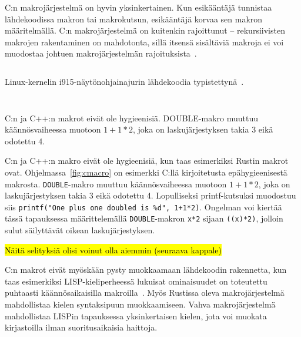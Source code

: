 C:n makrojärjestelmä on hyvin yksinkertainen. Kun esikääntäjä tunnistaa
lähdekoodissa makron tai makrokutsun, esikääntäjä korvaa sen makron
määritelmällä. C:n makrojärjestelmä on kuitenkin rajoittunut -- rekursiivisten
makrojen rakentaminen on mahdotonta, sillä itsensä sisältäviä makroja ei voi
muodostaa johtuen makrojärjestelmän rajoituksista~\citep[luku 6.10.3.4]{C18}.

\FloatBarrier

\begin{listing}[ht!]
    \inputminted{C}{c-error-handling.c}
    \caption{Linux-kernelin i915-näytönohjainajurin lähdekoodia
    typistettynä~\citep[\texttt{drivers/gpu/drm/i915/i915\_perf.c}, funktio
    \texttt{i915\_oa\_stream\_init}]{i915debugfs}.}
    \label{fig:cerrorhandling}
\end{listing}

\FloatBarrier

\FloatBarrier

\begin{listing}[ht!]
    \inputminted{C}{c-hygiene.c}
    \inputminted{text}{c-hygiene-output.txt}
    \caption{C:n ja C++:n makrot eivät ole hygieenisiä. DOUBLE-makro muuttuu
    käännösvaiheessa muotoon $1+1*2$, joka on laskujärjestyksen takia 3 eikä
    odotettu 4.}
    \label{fig:cmacro}
\end{listing}

\FloatBarrier

C:n ja C++:n makro eivät ole hygieenisiä, kun taas esimerkiksi Rustin makrot
ovat. Ohjelmassa~\ref{fig:cmacro} on esimerkki C:llä kirjoitetusta
epähygieenisestä makrosta. \texttt{DOUBLE}-makro muuttuu käännösvaiheessa
muotoon $1+1*2$, joka on laskujärjestyksen takia 3 eikä odotettu 4.
Lopulliseksi printf-kutsuksi muodostuu siis \texttt{printf("One plus one
doubled is \%d", 1+1*2)}. Ongelman voi kiertää tässä tapauksessa
määrittelemällä \texttt{DOUBLE}-makron \texttt{x*2} sijaan \texttt{((x)*2)},
jolloin sulut säilyttävät oikean laskujärjestyksen.

\hl{Näitä selityksiä olisi voinut olla aiemmin (seuraava kappale)}

C:n makrot eivät myöskään pysty muokkaamaan lähdekoodin rakennetta, kun taas
esimerkiksi LISP-kieliperheessä lukuisat ominaisuudet on toteutettu puhtaasti
käännösaikaisilla makroilla~\citep{lispexpressions}. Myös Rustissa oleva
makrojärjestelmä mahdollistaa kielen syntaksipuun muokkaamiseen. Vahva
makrojärjestelmä mahdollistaa LISPin tapauksessa yksinkertaisen kielen, jota
voi muokata kirjastoilla ilman suoritusaikaisia haittoja.

